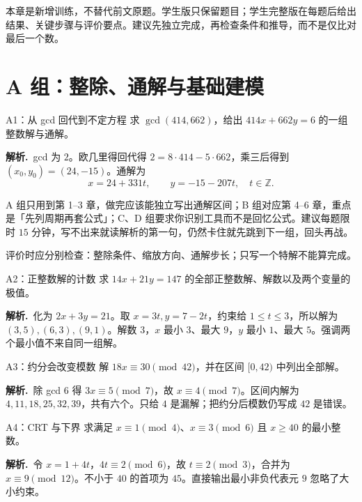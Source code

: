 \documentclass[UTF8,a4paper,11pt,twoside,openright,fontset=fandol]{ctexbook}
\theoremstyle{definition}
\newcommand{\Z}{\mathbb Z}
\newcommand{\sol}{\par\noindent\textbf{解析.}\ }
\begin{document}
本章是新增训练，不替代前文原题。学生版只保留题目；学生完整版在每题后给出结果、关键步骤与评价要点。建议先独立完成，再检查条件和推导，而不是仅比对最后一个数。

\section{A 组：整除、通解与基础建模}
\begin{problem}{A1：从 gcd 回代到不定方程}
求 $\gcd(414,662)$，给出 $414x+662y=6$ 的一组整数解与通解。
\end{problem}

\sol gcd 为 $2$。欧几里得回代得 $2=8\cdot414-5\cdot662$，乘三后得到 $(x_0,y_0)=(24,-15)$。通解为
\[
 x=24+331t,\qquad y=-15-207t,\quad t\in\Z.
\]

\begin{tip}[三档练习的用法]
A 组只用到第 1--3 章，做完应该能独立写出通解区间；B 组对应第 4--6 章，重点是「先列周期再套公式」；C、D 组要求你识别工具而不是回忆公式。建议每题限时 $15$ 分钟，写不出来就读解析的第一句，仍然卡住就先跳到下一组，回头再战。
\end{tip}

评价时应分别检查：整除条件、缩放方向、通解步长；只写一个特解不能算完成。


\begin{problem}{A2：正整数解的计数}
求 $14x+21y=147$ 的全部正整数解、解数以及两个变量的极值。
\end{problem}

\sol 化为 $2x+3y=21$。取 $x=3t,y=7-2t$，约束给 $1\le t\le3$，所以解为 $(3,5),(6,3),(9,1)$。解数 $3$，$x$ 最小 $3$、最大 $9$，$y$ 最小 $1$、最大 $5$。强调两个最小值不来自同一组解。


\begin{problem}{A3：约分会改变模数}
解 $18x\equiv30\pmod{42}$，并在区间 $[0,42)$ 中列出全部解。
\end{problem}

\sol 除 gcd $6$ 得 $3x\equiv5\pmod7$，故 $x\equiv4\pmod7$。区间内解为 $4,11,18,25,32,39$，共有六个。只给 $4$ 是漏解；把约分后模数仍写成 $42$ 是错误。


\begin{problem}{A4：CRT 与下界}
求满足 $x\equiv1\pmod4$、$x\equiv3\pmod6$ 且 $x\ge40$ 的最小整数。
\end{problem}

\sol 令 $x=1+4t$，$4t\equiv2\pmod6$，故 $t\equiv2\pmod3$，合并为 $x\equiv9\pmod{12}$。不小于 $40$ 的首项为 $45$。直接输出最小非负代表元 $9$ 忽略了大小约束。
\end{document}

